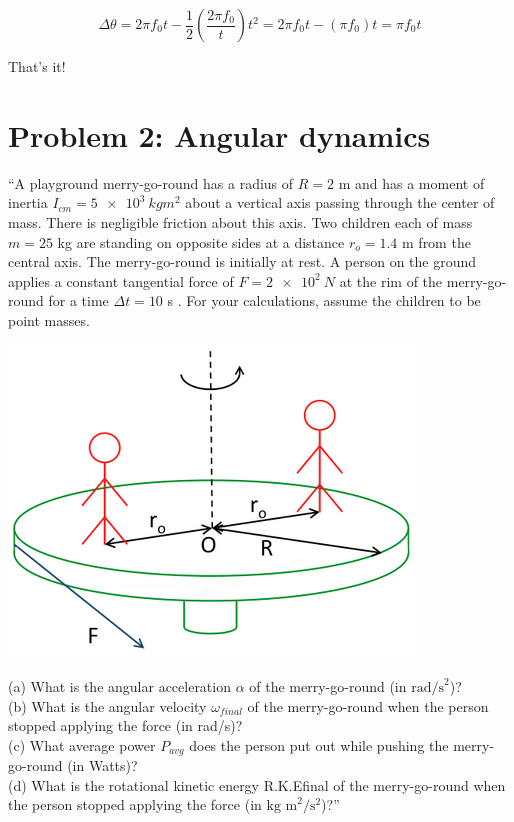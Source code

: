 \documentclass[8.01x]{subfiles}
\begin{document}
\begin{equation}
\Delta\theta = 2 \pi f_0 t - \frac{1}{2} \left(\frac{2 \pi f_0}{t}\right) t^2 = 2 \pi f_0 t - \left(\pi f_0\right) t = \pi f_0 t
\end{equation}

That's it!

\section{Problem 2: Angular dynamics}

``A playground merry-go-round has a radius of $R = 2$  m and has a moment of inertia $I_{cm} = \SI{5e3}{kg m^2}$ about a vertical axis passing through the center of mass. There is negligible friction about this axis. Two children each of mass $m = 25$ kg are standing on opposite sides at a distance $r_o = 1.4$ m from the central axis. The merry-go-round is initially at rest. A person on the ground applies a constant tangential force of $F = \SI{2e2}{N}$ at the rim of the merry-go-round for a time $\Delta t = 10$ s . For your calculations, assume the children to be point masses.

\begin{center}
\includegraphics[scale=0.65]{Graphics/h7p2}
\end{center}

(a) What is the angular acceleration $\alpha$ of the merry-go-round (in $\text{rad/s}^2$)?\\
(b) What is the angular velocity $\omega_{final}$ of the merry-go-round when the person stopped applying the force (in rad/s)?\\
(c) What average power $P_{avg}$ does the person put out while pushing the merry-go-round (in Watts)?\\
(d) What is the rotational kinetic energy R.K.Efinal of the merry-go-round when the person stopped applying the force (in $\text{kg m}^2/\text{s}^2$)?''
\end{document}
